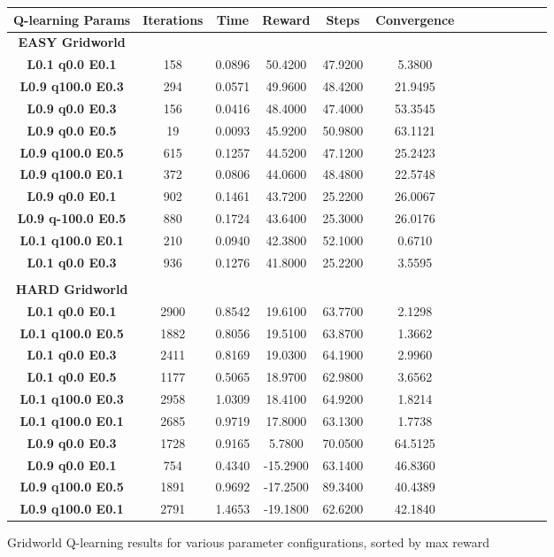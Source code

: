 \documentclass[h]{article}
\begin{document}
\begin{figure}[H] 
\centering
\begin{tabular}{ | c | c  | c | c | c | c | c | c| c| c| c| c| c | } 
\hline
\textbf{ Q-learning Params } & \textbf{Iterations} & \textbf{Time} & \textbf{Reward} & \textbf{Steps} & \textbf{Convergence}   \\
\hline
\textbf{EASY Gridworld} \\ \hline
\textbf{L0.1 q0.0 E0.1} & 158 & 0.0896 & 50.4200 & 47.9200 & 5.3800 \\ \hline
\textbf{L0.9 q100.0 E0.3} & 294 & 0.0571 & 49.9600 & 48.4200 & 21.9495 \\ \hline
\textbf{L0.9 q0.0 E0.3} & 156 & 0.0416 & 48.4000 & 47.4000 & 53.3545 \\ \hline
\textbf{L0.9 q0.0 E0.5} & 19 & 0.0093 & 45.9200 & 50.9800 & 63.1121 \\ \hline
\textbf{L0.9 q100.0 E0.5} & 615 & 0.1257 & 44.5200 & 47.1200 & 25.2423 \\ \hline
\textbf{L0.9 q100.0 E0.1} & 372 & 0.0806 & 44.0600 & 48.4800 & 22.5748 \\ \hline
\textbf{L0.9 q0.0 E0.1} & 902 & 0.1461 & 43.7200 & 25.2200 & 26.0067 \\ \hline
\textbf{L0.9 q-100.0 E0.5} & 880 & 0.1724 & 43.6400 & 25.3000 & 26.0176 \\ \hline
\textbf{L0.1 q100.0 E0.1} & 210 & 0.0940 & 42.3800 & 52.1000 & 0.6710 \\ \hline
\textbf{L0.1 q0.0 E0.3} & 936 & 0.1276 & 41.8000 & 25.2200 & 3.5595 \\ \hline
\hline
\\
\textbf{HARD Gridworld} \\ \hline
\textbf{L0.1 q0.0 E0.1} & 2900 & 0.8542 & 19.6100 & 63.7700 & 2.1298 \\ \hline
\textbf{L0.1 q100.0 E0.5} & 1882 & 0.8056 & 19.5100 & 63.8700 & 1.3662 \\ \hline
\textbf{L0.1 q0.0 E0.3} & 2411 & 0.8169 & 19.0300 & 64.1900 & 2.9960 \\ \hline
\textbf{L0.1 q0.0 E0.5} & 1177 & 0.5065 & 18.9700 & 62.9800 & 3.6562 \\ \hline
\textbf{L0.1 q100.0 E0.3} & 2958 & 1.0309 & 18.4100 & 64.9200 & 1.8214 \\ \hline
\textbf{L0.1 q100.0 E0.1} & 2685 & 0.9719 & 17.8000 & 63.1300 & 1.7738 \\ \hline
\textbf{L0.9 q0.0 E0.3} & 1728 & 0.9165 & 5.7800 & 70.0500 & 64.5125 \\ \hline
\textbf{L0.9 q0.0 E0.1} & 754 & 0.4340 & -15.2900 & 63.1400 & 46.8360 \\ \hline
\textbf{L0.9 q100.0 E0.5} & 1891 & 0.9692 & -17.2500 & 89.3400 & 40.4389 \\ \hline
\textbf{L0.9 q100.0 E0.1} & 2791 & 1.4653 & -19.1800 & 62.6200 & 42.1840 \\ 
\hline
\end{tabular}
\caption*{Gridworld Q-learning results for various parameter configurations, sorted by max reward } 
\end{figure}
\end{document}
